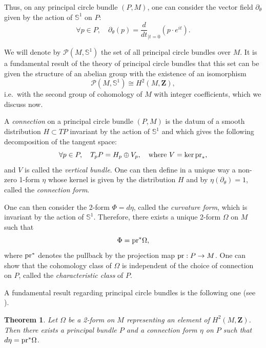 \documentclass[12pt,a4paper]{amsart}
\theoremstyle{plain}
\newtheorem{theorem}{Theorem}[section]
\theoremstyle{definition}
\theoremstyle{remark}
\numberwithin{equation}{section}
\theoremstyle{definition}
\def\Z{{\mathbf Z}}%
\def \bS{\mathbb{S}^{1}}
\def \pr{{\rm pr}}
\numberwithin{equation}{section}
\begin{document}
Thus, on any principal circle bundle $(P,M)$, one can consider the vector field $\partial_\theta$ given by the action of $\bS$ on $P$:
\begin{equation*}
    \forall p \in P,\quad \partial_\theta(p) = \frac{d}{dt}_{|t=0}(p\cdot e^{it}).
\end{equation*}

We will denote by $\mathcal{P}(M,\bS)$ the set of all principal circle bundles over $M$. It is a fundamental result of the theory of principal circle bundles that this set can be given the structure of an abelian group with the existence of an isomorphism
\begin{equation*}
    \mathcal{P}(M,\bS) \cong H^2(M,\Z),
\end{equation*}
i.e.~with the second group of cohomology of $M$ with integer coefficients, which we discuss now.

A \emph{connection} on a principal circle bundle $(P,M)$ is the datum of a smooth distribution $H\subset TP$ invariant by the action of $\bS$ and which gives the following decomposition of the tangent space:
\begin{equation*}
    \forall p\in P,\quad T_p P = H_p\oplus V_p,\quad\mbox{where}\ V = \ker \pr_{*},
\end{equation*}
and $V$ is called the \emph{vertical bundle}. One can then define in a unique way a non-zero 1-form $\eta$ whose kernel is given by the distribution $H$ and by $\eta(\partial_\theta)=1$, called the \emph{connection form}.

One can then consider the 2-form $\Phi = d\eta$, called the \emph{curvature form}, which is invariant by the action of $\bS$. Therefore, there exists a unique 2-form $\Omega$ on $M$ such that 
\begin{equation*}
    \Phi = \pr^* \Omega,
\end{equation*}
where $\pr^*$ denotes the pullback by the projection map $\pr : P\rightarrow M$.
One can show that the cohomology class of $\Omega$ is independent of the choice of connection on $P$, called the \emph{characteristic class} of $P$.

A fundamental result regarding principal circle bundles is the following one (see \cite[Theorem 2.5]{Blair}).

\begin{theorem}
\label{thm:existenceprincipalbundle}
    Let $\Omega$ be a 2-form on $M$ representing an element of $H^2(M,\Z)$. Then there exists a principal bundle $P$ and a connection form $\eta$ on $P$ such that $d\eta = \pr^* \Omega$.
\end{theorem}
\end{document}

